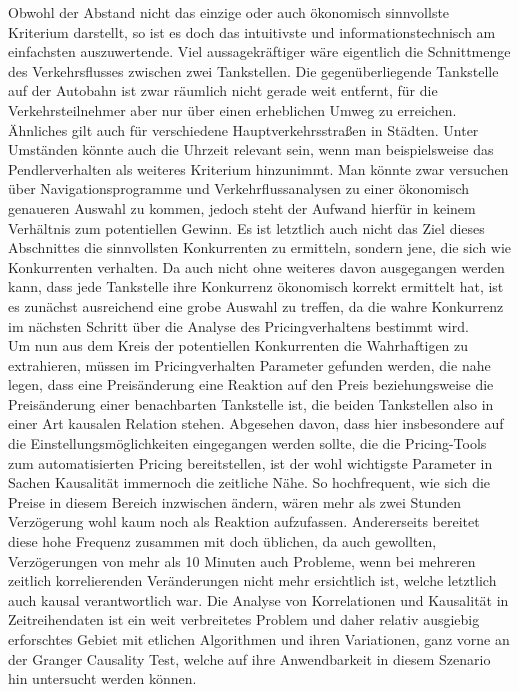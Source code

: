 \documentclass[12pt,a4paper,bibliography=totocnumbered,listof=totocnumbered]{scrartcl}
\begin{document}
Obwohl der Abstand nicht das einzige oder auch ökonomisch sinnvollste Kriterium darstellt, so ist es doch das intuitivste und informationstechnisch am einfachsten auszuwertende. Viel aussagekräftiger wäre eigentlich die Schnittmenge des Verkehrsflusses zwischen zwei Tankstellen. Die gegenüberliegende Tankstelle auf der Autobahn ist zwar räumlich nicht gerade  weit entfernt, für die Verkehrsteilnehmer aber nur über einen erheblichen Umweg zu erreichen. Ähnliches gilt auch für verschiedene Hauptverkehrsstraßen in Städten. Unter Umständen könnte auch die Uhrzeit relevant sein, wenn man beispielsweise das Pendlerverhalten als weiteres Kriterium hinzunimmt. Man könnte zwar versuchen über Navigationsprogramme und Verkehrflussanalysen zu einer ökonomisch genaueren Auswahl zu kommen, jedoch steht der Aufwand hierfür in keinem Verhältnis zum potentiellen Gewinn. Es ist letztlich auch nicht das Ziel dieses Abschnittes die sinnvollsten Konkurrenten zu ermitteln, sondern jene, die sich wie Konkurrenten verhalten. Da auch nicht ohne weiteres davon ausgegangen werden kann, dass jede Tankstelle ihre Konkurrenz ökonomisch korrekt ermittelt hat, ist es zunächst ausreichend eine grobe Auswahl zu treffen, da die wahre Konkurrenz im nächsten Schritt über die Analyse des Pricingverhaltens bestimmt wird.\\

Um nun aus dem Kreis der potentiellen Konkurrenten die Wahrhaftigen zu extrahieren, müssen im Pricingverhalten Parameter gefunden werden, die nahe legen, dass eine Preisänderung eine Reaktion auf den Preis beziehungsweise die Preisänderung einer benachbarten Tankstelle ist, die beiden Tankstellen also in einer Art kausalen Relation stehen. Abgesehen davon, dass hier insbesondere auf die Einstellungsmöglichkeiten eingegangen werden sollte, die die Pricing-Tools zum automatisierten Pricing bereitstellen, ist der wohl wichtigste Parameter in Sachen Kausalität immernoch die zeitliche Nähe. So hochfrequent, wie sich die Preise in diesem Bereich inzwischen ändern, wären mehr als zwei Stunden Verzögerung wohl kaum noch als Reaktion aufzufassen. Andererseits bereitet diese hohe Frequenz zusammen mit doch üblichen, da auch gewollten, Verzögerungen von mehr als 10 Minuten auch Probleme, wenn bei mehreren zeitlich korrelierenden Veränderungen nicht mehr ersichtlich ist, welche letztlich auch kausal verantwortlich war. Die Analyse von Korrelationen und Kausalität in Zeitreihendaten ist ein weit verbreitetes Problem und daher relativ ausgiebig erforschtes Gebiet mit etlichen Algorithmen und ihren Variationen, ganz vorne an der Granger Causality Test, welche auf ihre Anwendbarkeit in diesem Szenario hin untersucht werden können.\\
\end{document}
